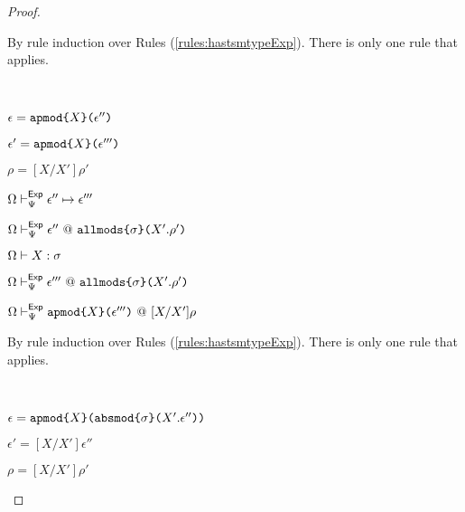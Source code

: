 \begin{proof}
\begin{byCases}
\item[\text{(\ref{rule:tsmexpStepsExp-apmod-1})}] By rule induction over Rules (\ref{rules:hastsmtypeExp}). There is only one rule that applies.
  \begin{byCases}
  \item[\text{(\ref{rule:hastsmtypeExp-apmod})}] ~
    \begin{pfsteps*}
      \item $\epsilon=\texttt{apmod}\texttt{\{}X\texttt{\}(}\epsilon''\texttt{)}$ 
      \item $\epsilon'=\texttt{apmod}\texttt{\{}X\texttt{\}(}\epsilon'''\texttt{)}$ 
      \item $\rho=[X/X']\rho'$ 
      \item $\Omega \vdash_{\Psi}^\mathsf{Exp} \epsilon'' \mapsto \epsilon'''$  
      \item $\Omega \vdash_{\Psi}^{\mathsf{Exp}} \epsilon'' ~@~ \texttt{allmods}\texttt{\{}\sigma\texttt{\}(}X'.\rho'\texttt{)}$  
      \item $\Omega \vdash X : \sigma$  
      \item $\Omega \vdash_{\Psi}^{\mathsf{Exp}} \epsilon''' ~@~ \texttt{allmods}\texttt{\{}\sigma\texttt{\}(}X'.\rho'\texttt{)}$ 
      \item $\Omega \vdash_{\Psi}^{\mathsf{Exp}} \texttt{apmod}\texttt{\{}X\texttt{\}(}\epsilon'''\texttt{)} ~@~ [X/X']\rho$ 
    \end{pfsteps*}
    \resetpfcounter
  \end{byCases}
\item[\text{(\ref{rule:tsmexpStepsExp-apmod-2})}] By rule induction over Rules (\ref{rules:hastsmtypeExp}). There is only one rule that applies.
  \begin{byCases}
    \item[\text{(\ref{rule:hastsmtypeExp-apmod})}] ~
      \begin{pfsteps*}
        \item $\epsilon=\texttt{apmod}\texttt{\{}X\texttt{\}(}\texttt{absmod}\texttt{\{}\sigma\texttt{\}(}X'.\epsilon''\texttt{)}\texttt{)}$ 
        \item $\epsilon'=[X/X']\epsilon''$ 
        \item $\rho=[X/X']\rho'$ 

\end{pfsteps*}
\end{byCases}
\end{byCases}
\end{proof}
